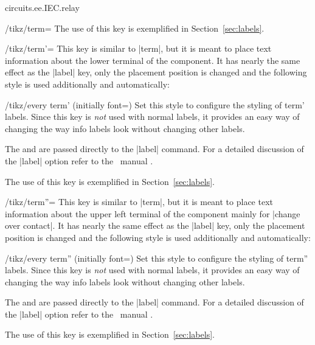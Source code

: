 \documentclass[a4paper]{ltxdoc}
\begin{document}
\begin{pgflibrary}{circuits.ee.IEC.relay}
\begin{key}{/tikz/term=}
  The use of this key is exemplified in Section~\ref{sec:labels}.
\end{key}

\begin{key}{/tikz/term'=}
  This key is similar to |term|, but it is meant to place text information about the lower terminal of the component. It has nearly the same effect as the |label| key, only the placement position is changed and the following style is used additionally and automatically:
  \begin{stylekey}{/tikz/every term' (initially {font=\string\scriptsize})}
    Set this style to configure the styling of term' labels. Since this
    key is \emph{not} used with normal labels, it provides an easy way
    of changing the way info labels look without changing other
    labels.
  \end{stylekey}
  The  and  are passed directly to the |label| command. For a detailed discussion of the |label| option refer to the \tikzname\ manual \cite{Tantau}.
  
  The use of this key is exemplified in Section~\ref{sec:labels}.
\end{key}

\begin{key}{/tikz/term''=}
  This key is similar to |term|, but it is meant to place text information about the upper left terminal of the component mainly for |change over contact|. It has nearly the same effect as the |label| key, only the placement position is changed and the following style is used additionally and automatically:
  \begin{stylekey}{/tikz/every term'' (initially {font=\string\scriptsize})}
    Set this style to configure the styling of term'' labels. Since this
    key is \emph{not} used with normal labels, it provides an easy way
    of changing the way info labels look without changing other
    labels.
  \end{stylekey}
  The  and  are passed directly to the |label| command. For a detailed discussion of the |label| option refer to the \tikzname\ manual \cite{Tantau}.
  
  The use of this key is exemplified in Section~\ref{sec:labels}.
\end{key}

\end{pgflibrary}
\end{document}
